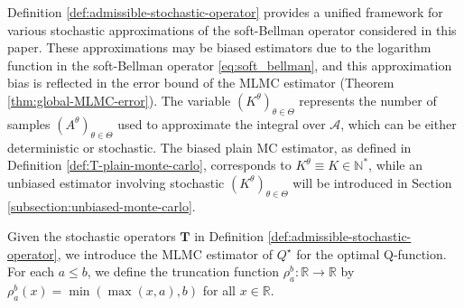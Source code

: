 \documentclass[11pt]{article}
\numberwithin{equation}{section}
\theoremstyle{definition}
\theoremstyle{remark}
\def\cA{\mathcal{A}}
\def\N{{\mathbb{N}}}
\def\R{{\mathbb R}}
\begin{document}
Definition \ref{def:admissible-stochastic-operator} 
provides a unified framework for various stochastic approximations of the soft-Bellman operator considered in this paper.
These approximations may be biased estimators due to the logarithm function in the soft-Bellman operator \eqref{eq:soft_bellman}, and this approximation bias is reflected in the error bound of the 
MLMC estimator (Theorem \ref{thm:global-MLMC-error}).
The variable 
$(K^\theta)_{\theta\in \Theta}$ represents
    the number of samples $(A^{\theta})_{\theta\in \Theta}$ used to approximate the integral over $\cA$, which can be either deterministic or stochastic.
    The  biased plain MC  estimator,
    as defined in Definition \ref{def:T-plain-monte-carlo},   corresponds to 
      $K^\theta \equiv K \in \N^*$,
      while   
   an unbiased  estimator involving   stochastic 
   $(K^\theta)_{\theta\in \Theta}$ will be introduced   in Section \ref{subsection:unbiased-monte-carlo}. 

Given the stochastic operators $\mathbf{T} $ in 
    Definition \ref{def:admissible-stochastic-operator},
    we introduce 
  the   MLMC estimator of $Q^\star$ for the optimal Q-function. 
For each $a \leq b$, we define the truncation function $\rho_a ^{b}: \R\to \R$ by $\rho_a ^{b}( x)= \min(\max(x,a),b)$ for all $x\in \R$.
\end{document}
